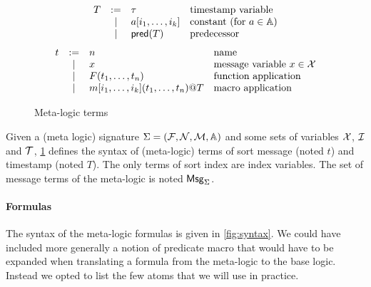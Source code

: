 \begin{figure}
\[
  \begin{array}{rcll}
    T &:=& \tau & \text{timestamp variable} \\
      &\mid& a[i_1,\ldots,i_k] & \text{constant (for $a\in\mathbb{A}$)} \\
      &\mid & \textsf{pred}(T) & \text{predecessor}
\end{array}
   \]
\[
     \begin{array}{rcll}
    t & := & n &\text{name} \\
    & \mid & x  & \text{message variable $x\in\mathcal{X}$} \\
    & \mid & F(t_1,\dots,t_n) &\text{function application}\\
    & \mid & m[i_1,\ldots,i_k](t_1,\ldots,t_n)@T &\text{macro application}\\
       \end{array}
     \]
     \caption{Meta-logic terms}\label{fig:terms}
\end{figure}

\begin{definition}
  Given a (meta logic) signature $\Sigma = (\mathcal{F},\mathcal{N},\mathcal{M},\mathbb{A})$
  and some sets of variables
  $\mathcal{X}$, $\mathcal{I}$ and $\mathcal{T}$,
  \cref{fig:terms} defines the syntax of (meta-logic) terms
  of sort message (noted $t$) and timestamp (noted $T$).
  The only terms of sort index are index variables.
  The set of message terms of the meta-logic is noted $\mathsf{Msg}_\Sigma$.
\end{definition}

\paragraph{Formulas}

The syntax of the meta-logic formulas is given in \cref{fig:syntax}.
We could have included more generally a notion of predicate macro that
would have to be expanded when translating a formula from the meta-logic
to the base logic. Instead we opted to list the few atoms that we
will use in practice.

